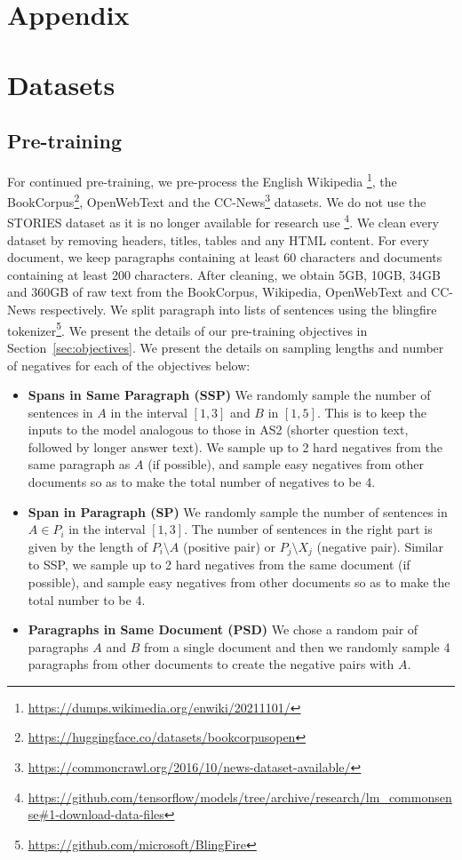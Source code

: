\clearpage

\section*{Appendix}

\section{Datasets}
\label{app:datasets}

\subsection{Pre-training}
For continued pre-training, we pre-process the English Wikipedia \footnote{\url{https://dumps.wikimedia.org/enwiki/20211101/}}, the BookCorpus\footnote{\url{https://huggingface.co/datasets/bookcorpusopen}}, OpenWebText \citep{Gokaslan2019OpenWeb} and the CC-News\footnote{\url{https://commoncrawl.org/2016/10/news-dataset-available/}} datasets. We do not use the STORIES dataset as it is no longer available for research use \footnote{\url{https://github.com/tensorflow/models/tree/archive/research/lm\_commonsense\#1-download-data-files}}. We clean every dataset by removing headers, titles, tables and any HTML content. For every document, we keep paragraphs containing at least 60 characters and documents containing at least 200 characters. After cleaning, we obtain 5GB, 10GB, 34GB and 360GB of raw text from the BookCorpus, Wikipedia, OpenWebText and CC-News respectively. We split paragraph into lists of sentences using the blingfire tokenizer\footnote{\url{https://github.com/microsoft/BlingFire}}. We present the details of our pre-training objectives in Section~\ref{sec:objectives}. We present the details on sampling lengths and number of negatives for each of the objectives below:

\begin{itemize}[wide, labelindent=0pt]
\itemsep-0.25em
    \item \textbf{Spans in Same Paragraph (SSP)}
    We randomly sample the number of sentences in $A$ in the interval $\left[1, 3\right]$ and $B$ in $\left[1, 5\right]$. This is to keep the inputs to the model analogous to those in AS2 (shorter question text, followed by longer answer text). We sample up to 2 hard negatives from the same paragraph as $A$ (if possible), and sample easy negatives from other documents so as to make the total number of negatives to be 4.
\item \textbf{Span in Paragraph (SP)}
    We randomly sample the number of sentences in $A \in P_i$ in the interval $\left[1, 3\right]$. The number of sentences in the right part is given by the length of $P_i \setminus A$ (positive pair) or $P_j \setminus X_j$ (negative pair). Similar to SSP, we sample up to 2 hard negatives from the same document (if possible), and sample easy negatives from other documents so as to make the total number to be 4.
\item \textbf{Paragraphs in Same Document (PSD)}
    We chose a random pair of paragraphs $A$ and $B$ from a single document and then we randomly sample 4 paragraphs from other documents to create the negative pairs with $A$.
\end{itemize}


